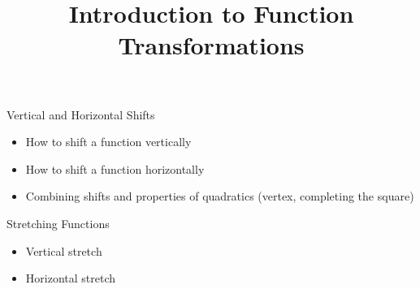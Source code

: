 \documentclass{ximera}
\author{}
\title{Introduction to Function Transformations}
\begin{document}
\begin{abstract}
\end{abstract}
\maketitle


\begin{objectives}

\item Vertical and Horizontal Shifts 
\begin{itemize}
	\item How to shift a function vertically
	\item How to shift a function horizontally
	\item Combining shifts and properties of quadratics (vertex, completing the square)
\end{itemize}

\item Stretching Functions
\begin{itemize}
	\item Vertical stretch
	\item Horizontal stretch
\end{itemize}




\end{objectives}
\end{document}
